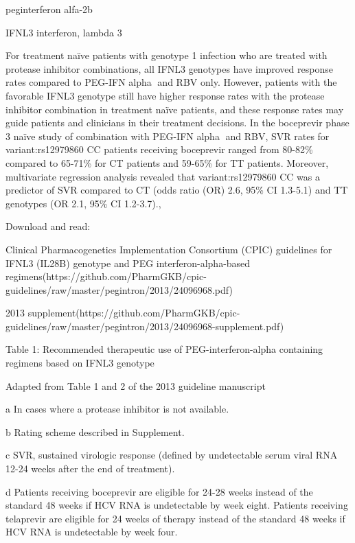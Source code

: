 \documentclass{resume} %
\begin{document}
\begin{rSection}{ peginterferon alfa-2b }
\begin{rSubsection}{ IFNL3 }{ interferon, lambda 3 }{}{}
 \newline
\item For treatment naïve patients with genotype 1 infection who are treated with protease inhibitor combinations, all IFNL3 genotypes have improved response rates compared to PEG-IFN alpha and RBV only. However, patients with the favorable IFNL3 genotype still have higher response rates with the protease inhibitor combination in treatment naïve patients, and these response rates may guide patients and clinicians in their treatment decisions. In the boceprevir phase 3 naïve study of combination with PEG-IFN alpha and RBV, SVR rates for variant:rs12979860 CC patients receiving boceprevir ranged from 80-82\% compared to 65-71\% for CT patients and 59-65\% for TT patients. Moreover, multivariate regression analysis revealed that variant:rs12979860 CC was a predictor of SVR compared to CT (odds ratio (OR) 2.6, 95\% CI 1.3-5.1) and TT genotypes (OR 2.1, 95\% CI 1.2-3.7)., 
 \newline
\item Download and read:
 \newline
\item Clinical Pharmacogenetics Implementation Consortium (CPIC) guidelines for IFNL3 (IL28B) genotype and PEG interferon-alpha-based regimens(https://github.com/PharmGKB/cpic-guidelines/raw/master/pegintron/2013/24096968.pdf) 
 \newline
\item 2013 supplement(https://github.com/PharmGKB/cpic-guidelines/raw/master/pegintron/2013/24096968-supplement.pdf)
 \newline
\item Table 1: Recommended therapeutic use of  PEG-interferon-alpha containing regimens based on IFNL3 genotype
 \newline
\item Adapted from Table 1 and 2 of the 2013 guideline manuscript
 \newline
\item a In cases where a protease inhibitor is not available. 
 \newline
\item b Rating scheme described in Supplement.
 \newline
\item c SVR,  sustained virologic response (defined by undetectable serum viral RNA 12-24 weeks after the end of treatment).
 \newline
\item d Patients receiving boceprevir are eligible for 24-28 weeks instead of the standard 48 weeks if HCV RNA is undetectable by week eight. Patients receiving telaprevir are eligible for 24 weeks of therapy instead of the standard 48 weeks if HCV RNA is undetectable by week four.

\end{rSubsection}
\end{rSection}
\end{document}
